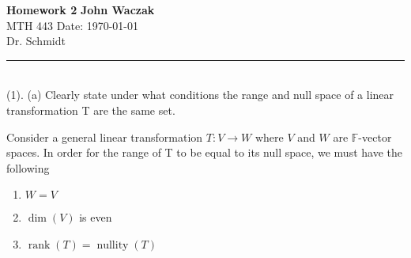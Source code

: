 \documentclass[a4paper, 11pt]{article}
\newcommand{\F}{\mathbb{F}}
\newenvironment{solution}{%
	\begin{list}{}{%
			\setlength{\topsep}{0pt}%
			\setlength{\leftmargin}{1.5cm}%
			\setlength{\rightmargin}{1.5cm}%
			\setlength{\listparindent}{\parindent}%
			\setlength{\itemindent}{\parindent}%
			\setlength{\parsep}{\parskip}%
		}%
		\item[]}{\end{list}}
\begin{document}
\noindent
\large\textbf{Homework 2} \hfill \textbf{John Waczak} \\
\normalsize MTH 443 \hfill  Date: \today \\
Dr. Schmidt
\par\noindent\rule{\textwidth}{0.4pt} \\

\noindent(1). (a) Clearly state under what conditions the range and null space of a linear transformation T are the same set. 
	\begin{solution}
		\noindent Consider a general linear transformation $T:V\to W$ where $V$ and $W$ are $\F$-vector spaces. In order for the range of T to be equal to its null space, we must have the following
			\begin{enumerate}
				\item $W = V$ 
				\item $\dim(V)$ is even 
				\item $\operatorname{rank}(T) = \operatorname{nullity}(T)$
			\end{enumerate}
	\end{solution}
\end{document}
